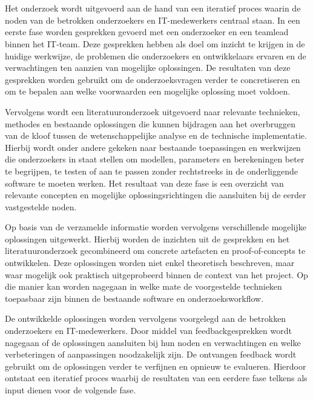
\chapter{}%
\label{ch:methodologie}
Het onderzoek wordt uitgevoerd aan de hand van een iteratief proces waarin de noden van de betrokken onderzoekers en IT-medewerkers centraal staan. In een eerste fase worden gesprekken gevoerd met een onderzoeker en een teamlead binnen het IT-team. Deze gesprekken hebben als doel om inzicht te krijgen in de huidige werkwijze, de problemen die onderzoekers en ontwikkelaars ervaren en de verwachtingen ten aanzien van mogelijke oplossingen. De resultaten van deze gesprekken worden gebruikt om de onderzoeksvragen verder te concretiseren en om te bepalen aan welke voorwaarden een mogelijke oplossing moet voldoen.

Vervolgens wordt een literatuuronderzoek uitgevoerd naar relevante technieken, methodes en bestaande oplossingen die kunnen bijdragen aan het overbruggen van de kloof tussen de wetenschappelijke analyse en de technische implementatie. Hierbij wordt onder andere gekeken naar bestaande toepassingen en werkwijzen die onderzoekers in staat stellen om modellen, parameters en berekeningen beter te begrijpen, te testen of aan te passen zonder rechtstreeks in de onderliggende software te moeten werken. Het resultaat van deze fase is een overzicht van relevante concepten en mogelijke oplossingsrichtingen die aansluiten bij de eerder vastgestelde noden.

Op basis van de verzamelde informatie worden vervolgens verschillende mogelijke oplossingen uitgewerkt. Hierbij worden de inzichten uit de gesprekken en het literatuuronderzoek gecombineerd om concrete artefacten en proof-of-concepts te ontwikkelen. Deze oplossingen worden niet enkel theoretisch beschreven, maar waar mogelijk ook praktisch uitgeprobeerd binnen de context van het project. Op die manier kan worden nagegaan in welke mate de voorgestelde technieken toepasbaar zijn binnen de bestaande software en onderzoeksworkflow.

De ontwikkelde oplossingen worden vervolgens voorgelegd aan de betrokken onderzoekers en IT-medewerkers. Door middel van feedbackgesprekken wordt nagegaan of de oplossingen aansluiten bij hun noden en verwachtingen en welke verbeteringen of aanpassingen noodzakelijk zijn. De ontvangen feedback wordt gebruikt om de oplossingen verder te verfijnen en opnieuw te evalueren. Hierdoor ontstaat een iteratief proces waarbij de resultaten van een eerdere fase telkens als input dienen voor de volgende fase.

